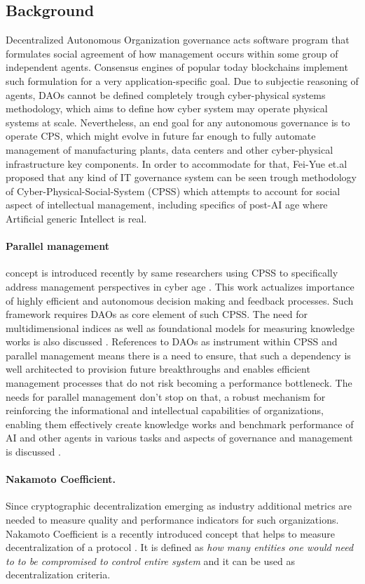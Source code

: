 \documentclass{article}
\begin{document}
\begin{CJK}{UTF8}{gbsn}
\begin{multicols}{2}
        \section{Background}
        Decentralized Autonomous Organization governance acts software program that formulates social agreement of how management occurs within some group of independent agents. Consensus engines of popular today blockchains implement such formulation for a very application-specific goal. Due to subjectie reasoning of agents, DAOs cannot be defined completely trough cyber-physical systems \cite{Lee2008} methodology, which aims to define how cyber system may operate physical systems at scale. Nevertheless, an end goal for any autonomous governance is to operate CPS, which might evolve in future far enough to fully automate management of manufacturing plants, data centers and other cyber-physical infrastructure key components. In order to accommodate for that, Fei-Yue et.al proposed that any kind of IT governance system can be seen trough methodology of Cyber-Physical-Social-System (CPSS) \cite{Fei2016} which attempts to account for social aspect of intellectual management, including specifics of post-AI age where Artificial generic Intellect is real.

        \paragraph{Parallel management} concept is introduced recently by same researchers using CPSS to specifically address management perspectives in cyber age \cite{Wang2022}. This work actualizes importance of highly efficient and autonomous decision making and feedback processes. Such framework requires DAOs as core element of such CPSS. The need for multidimensional indices as well as foundational models for measuring knowledge works is also discussed \cite{Juanjuan2023}. References to DAOs as instrument within CPSS and parallel management means there is a need to ensure, that such a dependency is well architected to provision future breakthroughs and enables efficient management processes that do not risk becoming a performance bottleneck. The needs for parallel management don't stop on that, a robust mechanism for reinforcing the informational and intellectual capabilities of organizations, enabling them effectively create knowledge works and benchmark performance of AI and other agents in various tasks and aspects of governance and management is discussed \cite{Wang2022}.
        \paragraph{Nakamoto Coefficient.} Since cryptographic decentralization emerging as industry additional metrics are needed to measure quality and performance indicators for such organizations. Nakamoto Coefficient is a recently introduced concept that helps to measure decentralization of a protocol \cite{Balaji2017}. It is defined as \textit{how many entities one would need to to be compromised to control entire system} and it can be used as decentralization criteria.


\end{multicols}
\end{CJK}
\end{document}
